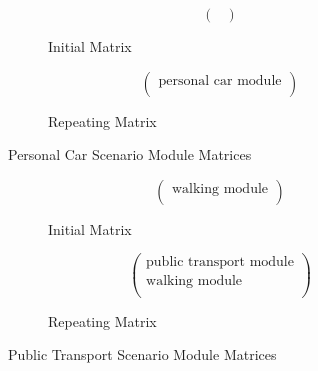 

\begin{figure}[ht]
    \centering
    \begin{subfigure}{0.45\linewidth}
        \centering
        \[
        \begin{pmatrix}
            \\
        \end{pmatrix}
        \]
        \caption{Initial Matrix}
    \end{subfigure}
    \hfill
    \begin{subfigure}{0.45\linewidth}
        \centering
        \[
        \begin{pmatrix}
            \text{personal car module}\\
        \end{pmatrix}
        \]
        \caption{Repeating Matrix}
    \end{subfigure}
    \caption{Personal Car Scenario Module Matrices}
    \label{fig:personal_car_scenario_module_matrix}
\end{figure}



\begin{figure}[ht]
    \centering
    \begin{subfigure}{0.45\linewidth}
        \centering
        \[
        \begin{pmatrix}
            \text{walking module} \\
        \end{pmatrix}
        \]
        \caption{Initial Matrix}
    \end{subfigure}
    \hfill
    \begin{subfigure}{0.45\linewidth}
        \centering
        \[
        \begin{pmatrix}
            \text{public transport module} \\
            \text{walking module} \\
        \end{pmatrix}
        \]
        \caption{Repeating Matrix}
    \end{subfigure}
    \caption{Public Transport Scenario Module Matrices}
    \label{fig:public_transport_scenario_module_matrix}
\end{figure}

